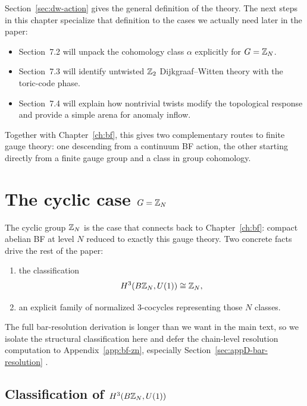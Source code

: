 \begin{remark}\label{rem:dw-forward}
Section~\ref{sec:dw-action} gives the general definition of the theory. The next steps in this chapter specialize that definition to the cases we actually need later in the paper:
\begin{itemize}
\item Section~7.2 will unpack the cohomology class $\alpha$ explicitly for $G=\mathbb{Z}_N$.
\item Section~7.3 will identify untwisted $\mathbb{Z}_2$ Dijkgraaf--Witten theory with the toric-code phase.
\item Section~7.4 will explain how nontrivial twists modify the topological response and provide a simple arena for anomaly inflow.
\end{itemize}
Together with Chapter~\ref{ch:bf}, this gives two complementary routes to finite gauge theory: one descending from a continuum BF action, the other starting directly from a finite gauge group and a class in group cohomology.
\end{remark}

\section{The cyclic case \texorpdfstring{$G=\mathbb{Z}_N$}{G=Z\_N}}\label{sec:dw-zn}

The cyclic group $\mathbb{Z}_N$ is the case that connects back to Chapter~\ref{ch:bf}: compact abelian BF at level $N$ reduced to exactly this gauge theory.  Two concrete facts drive the rest of the paper:
\begin{enumerate}
\item the classification
\begin{equation*}
H^3(B\mathbb{Z}_N,U(1))\cong \mathbb{Z}_N,
\end{equation*}
\item an explicit family of normalized $3$-cocycles representing those $N$ classes.
\end{enumerate}
The full bar-resolution derivation is longer than we want in the main text, so we isolate the structural classification here and defer the chain-level resolution computation to Appendix~\ref{app:bf-zn}, especially Section~\ref{sec:appD-bar-resolution} \cite{DijkgraafWitten1990,Brown1982}.

\subsection{Classification of \texorpdfstring{$H^3(B\mathbb{Z}_N,U(1))$}{H3(BZ\_N,U(1))}}

